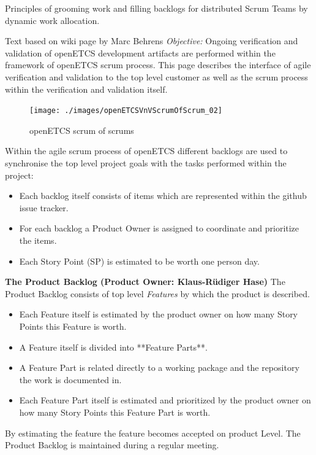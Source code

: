 Principles of grooming work and filling backlogs for distributed Scrum Teams by dynamic work allocation.

Text based on wiki page by Marc Behrens
\textit{Objective:} Ongoing verification and validation of openETCS development artifacts are performed within the framework of openETCS scrum process. This page describes the interface of agile verification and validation to the top level customer as well as the scrum process within the verification and validation itself.

\begin{figure}[h]
\centering
\texttt{[image: ./images/openETCSVnVScrumOfScrum\_02]}
\caption{openETCS scrum of scrums}
\label{fig:openETCSVnVScrumOfScrum}
\end{figure}

Within the agile scrum process of openETCS different backlogs are used to synchronise the top level project goals with the tasks performed within the project: 

\begin{itemize}
\item Each backlog itself consists of items which are represented within the github issue tracker. 
\item For each backlog a Product Owner is assigned to coordinate and prioritize the items.
\item Each Story Point (SP) is estimated to be worth one person day.
\end{itemize}


\textbf{The Product Backlog (Product Owner: Klaus-Rüdiger Hase)}
The Product Backlog consists of top level \textit{Features} by which the product is described.
\begin{itemize}
\item  Each Feature itself is estimated by the product owner on how many Story Points this Feature is worth.
\item  A Feature itself is divided into **Feature Parts**.
\item  A Feature Part is related directly to a working package and the repository the work is documented in.
\item  Each Feature Part itself is estimated and prioritized by the product owner on how many Story Points this Feature Part is worth.
\end{itemize}


By estimating the feature the feature becomes accepted on product Level.
The Product Backlog is maintained during a regular meeting.

